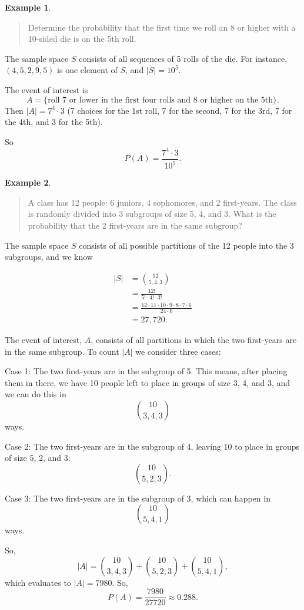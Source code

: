 \documentclass[
]{book}
\theoremstyle{definition}
\theoremstyle{definition}
\newtheorem{example}{Example}[chapter]
\theoremstyle{definition}
\theoremstyle{definition}
\theoremstyle{remark}
\begin{document}
\begin{example}
\protect\hypertarget{exm:10sided-die}{}\label{exm:10sided-die}\leavevmode

\begin{quote}
Determine the probability that the first time we roll an 8 or higher with a 10-sided die is on the 5th roll.
\end{quote}

The sample space \(S\) consists of all sequences of 5 rolls of the die. For instance, \((4,5,2,9,5)\) is one element of \(S\), and \(|S| = 10^5\).

The event of interest is \[A = \{ \text{roll 7 or lower in the first four rolls and 8 or higher on the 5th} \}.\]
Then \(|A| = 7^4 \cdot 3\) (7 choices for the 1st roll, 7 for the second, 7 for the 3rd, 7 for the 4th, and 3 for the 5th).

So \[P(A) = \frac{7^4 \cdot 3}{10^5}.\]

\end{example}

\begin{example}
\protect\hypertarget{exm:partition-set}{}\label{exm:partition-set}\leavevmode

\begin{quote}
A class has 12 people: 6 juniors, 4 sophomores, and 2 first-years. The class is randomly divided into 3 subgroups of size 5, 4, and 3. What is the probability that the 2 first-years are in the same subgroup?
\end{quote}

The sample space \(S\) consists of all possible partitions of the 12 people into the 3 subgroups, and we know

\begin{align*}
|S| &= \binom{12}{5,4,3} \\
    &= \frac{12!}{5! \cdot 4! \cdot 3!}\\ 
    &= \frac{12\cdot 11 \cdot 10 \cdot 9 \cdot 8 \cdot 7 \cdot 6}{24 \cdot 6}\\
    &= 27,720.
\end{align*}

The event of interest, \(A\), consists of all partitions in which the two first-years are in the same subgroup. To count \(|A|\) we consider three cases:

Case 1: The two first-years are in the subgroup of 5. This means, after placing them in there, we have 10 people left to place in groups of size 3, 4, and 3, and we can do this in \[\binom{10}{3, 4, 3}\] ways.

Case 2: The two first-years are in the subgroup of 4, leaving 10 to place in groups of size 5, 2, and 3: \[\binom{10}{5,2,3}.\]

Case 3: The two first-years are in the subgroup of 3, which can happen in \[\binom{10}{5,4,1}\] ways.

So,\[|A| = \binom{10}{3, 4, 3} + \binom{10}{5, 2, 3} + \binom{10}{5, 4, 1},\] which evaluates to \(|A| = 7980\). So, \[P(A) = \frac{7980}{27720} \approx 0.288.\]

\end{example}
\end{document}
